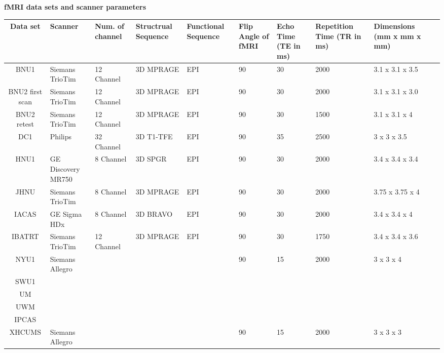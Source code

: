 \documentclass{article}
\begin{document}
\newpage
\noindent\bf{fMRI data sets and scanner parameters}
\begin{table}[]
	\centering
	\small
	\setlength\tabcolsep{2pt}
	\begin{tabular}{|c|p{1.2cm}|p{1.4cm}|p{1.4cm}|p{2cm}|p{2cm}|p{2cm}|p{2cm}|p{2cm}|p{2cm}|}
		\hline
		Data set      &Scanner & Num. of channel     &   Structrual Sequence &	Functional Sequence &	Flip Angle of fMRI	& Echo Time (TE in ms) &	Repetition Time (TR in ms)	&  Dimensions (mm x mm x mm) \\ \hline
		BNU1&	Siemans TrioTim&	12 Channel&	3D MPRAGE&	EPI&	90&	30&	2000&	3.1 x 3.1 x 3.5\\ \hline
		BNU2 first scan&	Siemans TrioTim&12 Channel	&3D MPRAGE&	EPI&	90&	30&	2000&	3.1 x 3.1 x 3.0 \\\hline
		BNU2 retest	&Siemans TrioTim&	12 Channel&	3D MPRAGE&	EPI	&90	&30&	1500&	3.1 x 3.1 x 4 \\\hline
		DC1&	Philips&	32 Channel&	3D T1-TFE&	EPI&	90&	35&	2500&	3 x 3 x 3.5 \\\hline
		HNU1&	GE Discovery MR750&	8 Channel&	3D SPGR&	EPI	&90	&30&	2000&	3.4 x 3.4 x 3.4 \\\hline
		JHNU&	Siemans TrioTim&	8 Channel	&3D MPRAGE&	EPI	&90	&30	&2000&	3.75 x 3.75 x 4 \\\hline
		IACAS&	GE Sigma HDx&	8 Channel&	3D BRAVO&	EPI&	90&	30&	2000&	3.4 x 3.4 x 4 \\\hline
		IBATRT&	Siemans TrioTim&	12 Channel&	3D MPRAGE&	EPI&	90&	30&	1750&	3.4 x 3.4 x 3.6\\\hline
		NYU1&	Siemans Allegro	& & &	&	90&	15	&2000&	3 x 3 x 4 \\\hline
		SWU1		& & &	& & & &	&\\\hline						
		UM				& & &	& & & &	&\\\hline						
		UWM			& & &	& & & &	&\\\hline							
		IPCAS		& & &	& & & &	&\\\hline
		XHCUMS&	Siemans Allegro	& & &	&	90&	15	&2000&	3 x 3 x 3 \\\hline						
	\end{tabular}
\end{table}

\newpage
\small{


}
\end{document}
